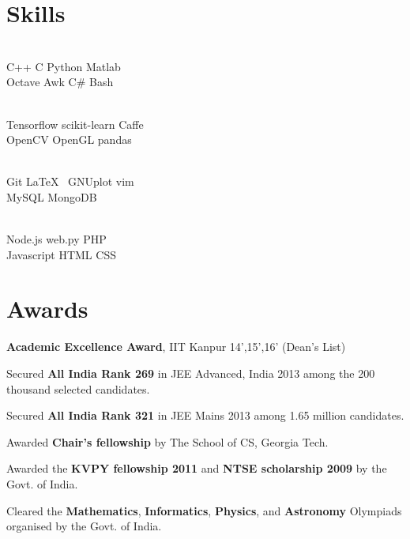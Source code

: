 \documentclass[US paper]{deedy-resume} %
\begin{document}
{\vspace{-3pt}
\sectionspace %


\vspace{-5pt}
\section{Skills}
\vspace{-10pt}
\begin{multicols}{4}
[
]
 \\
C++ \textbullet{} C \textbullet{} Python \textbullet{} Matlab \\
 \textbullet{} Octave \textbullet{} Awk \textbullet{} C\# \textbullet{} Bash 


\columnbreak

 \\
Tensorflow  \textbullet{} scikit-learn \textbullet{} Caffe \\\textbullet{} OpenCV \textbullet{} OpenGL \textbullet{} pandas \\

\columnbreak

 \\
Git \textbullet{} \LaTeX\ \textbullet{} GNUplot \textbullet{} vim \\
\textbullet{} MySQL \textbullet{} MongoDB
\columnbreak


 \\
Node.js \textbullet{} web.py  \textbullet{} PHP \\
\textbullet{} Javascript \textbullet{} HTML \textbullet{} CSS 


\end{multicols}
\vspace{-10pt}

\vspace{-3pt}
\section{Awards} 
\runsubsection{}
\location{}
\vspace{5pt}
{
\begin{tightitemize}
\item \textbf{Academic Excellence Award}, IIT Kanpur 14',15',16' (Dean's List)
\item Secured \textbf{All India Rank 269} in JEE Advanced, India 2013 among the 200 thousand selected candidates. 
\item Secured \textbf{All India Rank 321} in JEE Mains 2013 among 1.65 million candidates.
\item Awarded \textbf{Chair's fellowship} by The School of CS, Georgia Tech.
\item Awarded the \textbf{KVPY fellowship 2011} and \textbf{NTSE scholarship 2009} by the Govt. of India.
\item Cleared the \textbf{Mathematics}, \textbf{Informatics}, \textbf{Physics}, and \textbf{Astronomy} Olympiads organised by the Govt. of India.
\end{tightitemize}
}
\vspace{-3pt}
}
\end{document}
